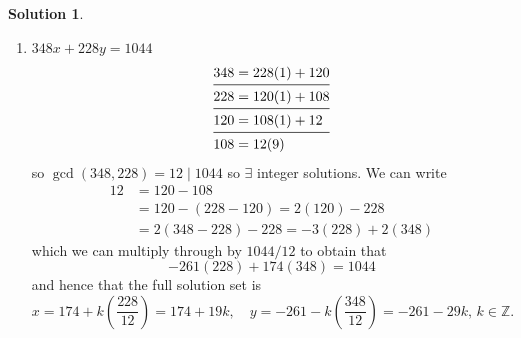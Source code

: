 \documentclass[10pt]{article}
\theoremstyle{definition}
\newtheorem{soln}{Solution}
\begin{document}
\begin{soln}
\begin{enumerate}[label=(\alph*)]
\begin{enumerate}[label=(\roman*)]
            \item $348x+228y=1044$
                  \begin{align*}
                    348 & =228(1)+120 \\
                    \midrule
                    228 & =120(1)+108 \\
                    \midrule
                    120 & =108(1)+12  \\
                    \midrule
                    108 & =12(9)
                  \end{align*}
                  so $\gcd(348,228)=12\mid 1044$ so $\exists$ integer solutions. We can write
                  \begin{align*}
                    12 & =120-108                       \\
                       & =120-(228-120)=2(120)-228      \\
                       & =2(348-228)-228=-3(228)+2(348)
                  \end{align*}
                  which we can multiply through by $1044/12$ to obtain that
                  $$-261(228)+174(348)=1044$$
                  and hence that the full solution set is
                  $$x=174+k\left(\frac{228}{12}\right)=174+19k,\quad y=-261-k\left(\frac{348}{12}\right)=-261-29k,\, k\in\mathbb{Z}.$$
          \end{enumerate}
  \end{enumerate}
\end{soln}
\end{document}
